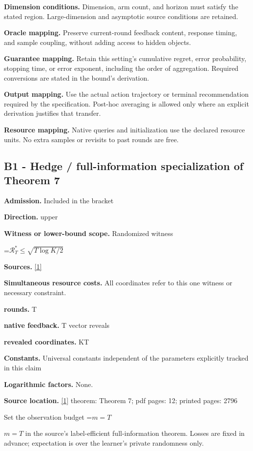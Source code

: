 \documentclass[10pt,a4paper]{article}
\newcommand{\AtlasMath}[1]{\par\begingroup\centering\setbox0=\hbox{$\displaystyle #1$}\ifdim\wd0>1.4\linewidth\typeout{ATLAS WIDE FORMULA: \the\wd0}\fi\ifdim\wd0>\linewidth\resizebox{\linewidth}{!}{\box0}\else\box0\fi\par\endgroup}
\newcommand{\AtlasInlineMath}[1]{\begingroup\setbox0=\hbox{$#1$}\ifdim\wd0>.4\linewidth\endgroup\AtlasMath{#1}\else\endgroup$#1$\fi}
\begin{document}
\textbf{Dimension conditions.} Dimension, arm count, and horizon must satisfy the stated region. Large-dimension and asymptotic source conditions are retained.

\textbf{Oracle mapping.} Preserve current-round feedback content, response timing, and sample coupling, without adding access to hidden objects.

\textbf{Guarantee mapping.} Retain this setting's cumulative regret, error probability, stopping time, or error exponent, including the order of aggregation. Required conversions are stated in the bound's derivation.

\textbf{Output mapping.} Use the actual action trajectory or terminal recommendation required by the specification. Post-hoc averaging is allowed only where an explicit derivation justifies that transfer.

\textbf{Resource mapping.} Native queries and initialization use the declared resource units. No extra samples or revisits to past rounds are free.

\subsection{B1 - Hedge / full-information specialization of Theorem 7}
\textbf{Admission.} Included in the bracket

\textbf{Direction.} upper

\textbf{Witness or lower-bound scope.} Randomized witness

\AtlasMath{\mathcal{R}_T^*\le\sqrt{T\log K/2}}
\textbf{Sources.} \href{https://jmlr.org/papers/volume11/audibert10a/audibert10a.pdf}{[1]}

\textbf{Simultaneous resource costs.} All coordinates refer to this one witness or necessary constraint.

\textbf{rounds.} T

\textbf{native feedback.} T vector reveals

\textbf{revealed coordinates.} KT

\textbf{Constants.} Universal constants independent of the parameters explicitly tracked in this claim

\textbf{Logarithmic factors.} None.

\textbf{Source location.} \href{https://jmlr.org/papers/volume11/audibert10a/audibert10a.pdf}{[1]} theorem: Theorem 7; pdf pages: 12; printed pages: 2796

Set the observation budget \AtlasInlineMath{m=T} in the source's label-efficient full-information theorem. Losses are fixed in advance; expectation is over the learner's private randomness only.
\end{document}
